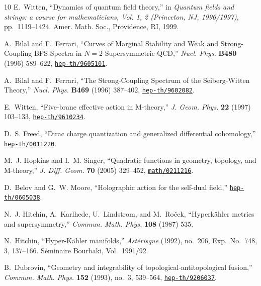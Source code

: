 \begin{thebibliography}{10}
E.~Witten, ``Dynamics of quantum field theory,'' in {\em Quantum fields and
  strings: a course for mathematicians, Vol. 1, 2 (Princeton, NJ, 1996/1997)},
  pp.~1119--1424.
\newblock Amer. Math. Soc., Providence, RI, 1999.

A.~Bilal and F.~Ferrari, ``{Curves of Marginal Stability and Weak and
  Strong-Coupling BPS Spectra in {$N=2$} Supersymmetric {QCD}},'' {\em Nucl.
  Phys.} {\bf B480} (1996) 589--622,
\href{http://www.arXiv.org/abs/hep-th/9605101}{{\tt hep-th/9605101}}.

A.~Bilal and F.~Ferrari, ``{The Strong-Coupling Spectrum of the Seiberg-Witten
  Theory},'' {\em Nucl. Phys.} {\bf B469} (1996) 387--402,
\href{http://www.arXiv.org/abs/hep-th/9602082}{{\tt hep-th/9602082}}.

E.~Witten, ``{Five-brane effective action in M-theory},'' {\em J. Geom. Phys.}
  {\bf 22} (1997) 103--133,
\href{http://www.arXiv.org/abs/hep-th/9610234}{{\tt hep-th/9610234}}.

D.~S. Freed, ``{Dirac charge quantization and generalized differential
  cohomology},''
\href{http://www.arXiv.org/abs/hep-th/0011220}{{\tt hep-th/0011220}}.

M.~J. Hopkins and I.~M. Singer, ``{Quadratic functions in geometry, topology,
  and M-theory},'' {\em J. Diff. Geom.} {\bf 70} (2005) 329--452,
\href{http://www.arXiv.org/abs/math/0211216}{{\tt math/0211216}}.

D.~Belov and G.~W. Moore, ``{Holographic action for the self-dual field},''
\href{http://www.arXiv.org/abs/hep-th/0605038}{{\tt hep-th/0605038}}.

N.~J. Hitchin, A.~Karlhede, U.~Lindstrom, and M.~Ro\v{c}ek, ``Hyperk{\"a}hler
  metrics and supersymmetry,'' {\em Commun. Math. Phys.} {\bf 108} (1987)
535.

N.~Hitchin, ``Hyper-{K}\"ahler manifolds,'' {\em Ast\'erisque} (1992), no.~206,
  Exp.\ No.\ 748, 3, 137--166. S\'eminaire Bourbaki, Vol.\ 1991/92.

B.~Dubrovin, ``Geometry and integrability of topological-antitopological
  fusion,'' {\em Commun. Math. Phys.} {\bf 152} (1993), no.~3, 539--564,
  \href{http://www.arXiv.org/abs/hep-th/9206037}{{\tt hep-th/9206037}}.


\end{thebibliography}
